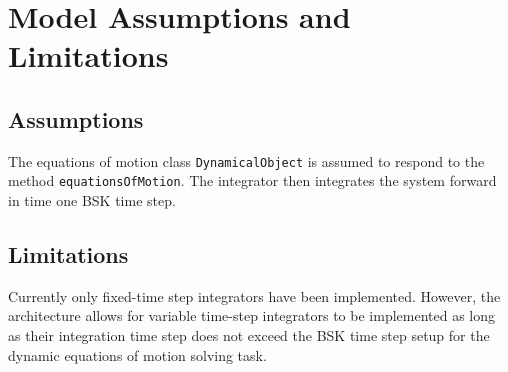 
\section{Model Assumptions and Limitations}

\subsection{Assumptions}

The equations of motion class {\tt DynamicalObject} is assumed to respond to the method  {\tt equationsOfMotion}.  The integrator then integrates the system forward in time one BSK time step.  

\subsection{Limitations}

Currently only fixed-time step integrators have been implemented.  However, the architecture allows for variable time-step integrators to be implemented as long as their integration time step does not exceed the BSK time step setup for the dynamic equations of motion solving task. 
